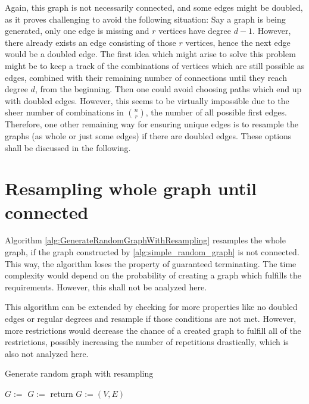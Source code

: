 Again, this graph is not necessarily connected, and some edges might be doubled, as it proves challenging to avoid the following situation: Say a graph is being generated, only one edge is missing and $r$ vertices have degree $d-1$. However, there already exists an edge consisting of those $r$ vertices, hence the next edge would be a doubled edge. The first idea which might arise to solve this problem might be to keep a track of the combinations of vertices which are still possible as edges, combined with their remaining number of connections until they reach degree $d$, from the beginning. Then one could avoid choosing paths which end up with doubled edges. However, this seems to be virtually impossible due to the sheer number of combinations in $n\choose r$, the number of all possible first edges. Therefore, one other remaining way for ensuring unique edges is to resample the graphs (as whole or just some edges) if there are doubled edges. These options shall be discussed in the following.

\section{Resampling whole graph until connected}
Algorithm \ref{alg:GenerateRandomGraphWithResampling} resamples the whole graph, if the graph constructed by \cref{alg:simple_random_graph} is not connected. This way, the algorithm loses the property of guaranteed terminating. The time complexity would depend on the probability of creating a graph which fulfills the requirements. However, this shall not be analyzed here. 


This algorithm can be extended by checking for more properties like no doubled edges or regular degrees and resample if those conditions are not met. However, more restrictions would decrease the chance of a created graph to fulfill all of the restrictions, possibly increasing the number of repetitions drastically, which is also not analyzed here.



\begin{algorithm}[htpb]
	\caption{Generate random graph with resampling\label{alg:GenerateRandomGraphWithResampling}} 
	\begin{algorithmic}
		\State $G:=$ 
		\State $G:=$ 
		\EndWhile
		\State return $G:=(V,E)$	
		\EndFunction 
	\end{algorithmic}
\end{algorithm}	

